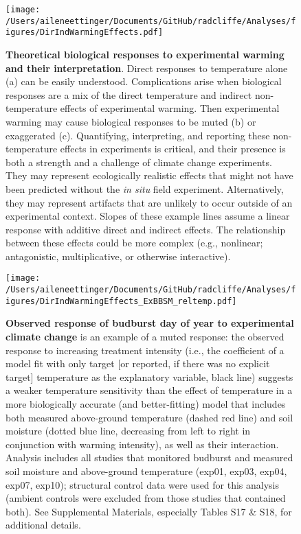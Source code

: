 \documentclass{article}
\begin{document}
 \clearpage
 \begin{figure}[h!]
\centering
 \texttt{[image: /Users/aileneettinger/Documents/GitHub/radcliffe/Analyses/figures/DirIndWarmingEffects.pdf]} 
 \caption{\textbf{Theoretical biological responses to experimental warming and their interpretation}. Direct responses to temperature alone (a) can be easily understood. Complications arise when biological responses are a mix of the direct temperature and indirect non-temperature effects of experimental warming. Then experimental warming may cause biological responses to be muted (b) or exaggerated (c). Quantifying, interpreting, and reporting these non-temperature effects in experiments is critical, and their presence is both a strength and a challenge of climate change experiments. They may represent ecologically realistic effects that might not have been predicted without the \emph{in situ} field experiment. Alternatively, they may represent artifacts that are unlikely to occur outside of an experimental context. Slopes of these example lines assume a linear response with additive direct and indirect effects. The relationship between these effects could be more complex (e.g., nonlinear; antagonistic, multiplicative, or otherwise interactive).} 
\label{fig:biolimp}
\end{figure}
\clearpage
\begin{figure}[h!]
\centering
 \texttt{[image: /Users/aileneettinger/Documents/GitHub/radcliffe/Analyses/figures/DirIndWarmingEffects\_ExBBSM\_reltemp.pdf]} 
 \caption{\textbf{Observed response of budburst day of year to experimental climate change} is an example of a muted response: the observed response to increasing treatment intensity (i.e., the coefficient of a model fit with only target [or reported, if there was no explicit target] temperature as the explanatory variable, black line) suggests a weaker temperature sensitivity than the effect of temperature in a more biologically accurate (and better-fitting) model that includes both measured above-ground temperature (dashed red line) and soil moisture (dotted blue line, decreasing from left to right in conjunction with warming intensity), as well as their interaction. Analysis includes all studies that monitored budburst and measured soil moisture and above-ground temperature (exp01, exp03, exp04, exp07, exp10); structural control data were used for this analysis (ambient controls were excluded from those studies that contained both). See Supplemental Materials, especially Tables S17 \& S18, for additional details.} 
 
\label{fig:phen}
\end{figure}
\clearpage
\end{document}
